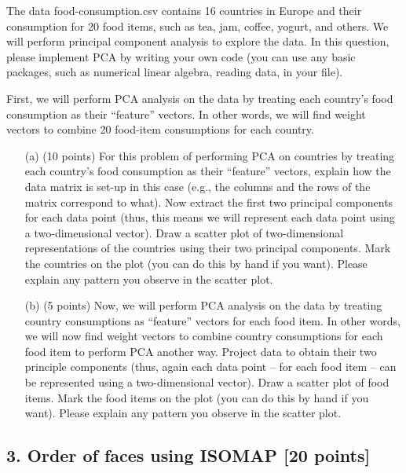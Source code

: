 \documentclass[twoside,10pt]{article}
\begin{document}
The data \textsf{food-consumption.csv} contains 16 countries in Europe and their consumption for 20 food items, such as tea, jam, coffee, yogurt, and others. We will perform principal component analysis to explore the data. In this question, please implement PCA by writing your own code (you can use any basic packages, such as numerical linear algebra, reading data, in your file).


\vspace{.1in}
First, we will perform PCA analysis on the data by treating each country's food consumption as their ``feature'' vectors. In other words, we will find weight vectors to combine 20 food-item consumptions for each country.  
 
\begin{enumerate}

\item[(a)] (10 points) For this problem of performing PCA on countries by treating each country's food consumption as their ``feature'' vectors, explain how the data matrix is set-up in this case (e.g., the columns and the rows of the matrix correspond to what). Now extract the first two principal components for each data point (thus, this means we will represent each data point using a two-dimensional vector). Draw a scatter plot of two-dimensional representations of the countries using their two principal components. Mark the countries on the plot (you can do this by hand if you want). Please explain any pattern you observe in the scatter plot.

\item[(b)] (5 points) Now, we will perform PCA analysis on the data by treating country consumptions as ``feature'' vectors for each food item. In other words, we will now find weight vectors to combine country consumptions for each food item to perform PCA another way. Project data to obtain their two principle components (thus, again each data point -- for each food item -- can be represented using a two-dimensional vector). Draw a scatter plot of food items. Mark the food items on the plot (you can do this by hand if you want). Please explain any pattern you observe in the scatter plot.
\end{enumerate}


\clearpage

\subsection*{3. Order of faces using ISOMAP [20 points]}
\end{document}
